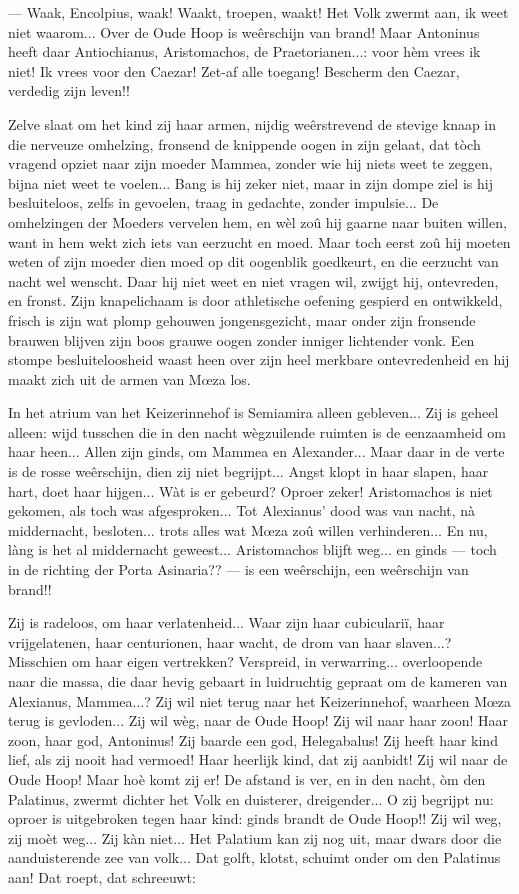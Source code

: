 \documentclass[a4paper, 12pt, oneside, dutch]{article}
\begin{document}
--- Waak, Encolpius, waak! Waakt, troepen, waakt! Het Volk zwermt aan, ik weet niet waarom... Over de Oude Hoop is weêrschijn van brand! Maar Antoninus heeft daar Antiochianus, Aristomachos, de Praetorianen...: voor hèm vrees ik niet! Ik vrees voor den Caezar! Zet-af alle toegang! Bescherm den Caezar, verdedig zijn leven!!

Zelve slaat om het kind zij haar armen, nijdig weêrstrevend de stevige knaap in die nerveuze omhelzing, fronsend de knippende oogen in zijn gelaat, dat tòch vragend opziet naar zijn moeder Mammea, zonder wie hij niets weet te zeggen, bijna niet weet te voelen... Bang is hij zeker niet, maar in zijn dompe ziel is hij besluiteloos, zelfs in gevoelen, traag in gedachte, zonder impulsie... De omhelzingen der Moeders vervelen hem, en wèl zoû hij gaarne naar buiten willen, want in hem wekt zich iets van eerzucht en moed. Maar toch eerst zoû hij moeten weten of zijn moeder dien moed op dit oogenblik goedkeurt, en die eerzucht van nacht wel wenscht. Daar hij niet weet en niet vragen wil, zwijgt hij, ontevreden, en fronst. Zijn knapelichaam is door athletische oefening gespierd en ontwikkeld, frisch is zijn wat plomp gehouwen jongensgezicht, maar onder zijn fronsende brauwen blijven zijn boos grauwe oogen zonder inniger lichtender vonk. Een stompe besluiteloosheid waast heen over zijn heel merkbare ontevredenheid en hij maakt zich uit de armen van Mœza los.

In het atrium van het Keizerinnehof is Semiamira alleen gebleven... Zij is geheel alleen: wijd tusschen die in den nacht wègzuilende ruimten is de eenzaamheid om haar heen... Allen zijn ginds, om Mammea en Alexander... Maar daar in de verte is de rosse weêrschijn, dien zij niet begrijpt... Angst klopt in haar slapen, haar hart, doet haar hijgen... Wàt is er gebeurd? Oproer zeker! Aristomachos is niet gekomen, als toch was afgesproken... Tot Alexianus' dood was van nacht, nà middernacht, besloten... trots alles wat Mœza zoû willen verhinderen... En nu, làng is het al middernacht geweest... Aristomachos blijft weg... en ginds --- toch in de richting der Porta Asinaria?? --- is een weêrschijn, een weêrschijn van brand!!

Zij is radeloos, om haar verlatenheid... Waar zijn haar cubiculariï, haar vrijgelatenen, haar centurionen, haar wacht, de drom van haar slaven...? Misschien om haar eigen vertrekken? Verspreid, in verwarring... overloopende naar die massa, die daar hevig gebaart in luidruchtig gepraat om de kameren van Alexianus, Mammea...? Zij wil niet terug naar het Keizerinnehof, waarheen Mœza terug is gevloden... Zij wil wèg, naar de Oude Hoop! Zij wil naar haar zoon! Haar zoon, haar god, Antoninus! Zij baarde een god, Helegabalus! Zij heeft haar kind lief, als zij nooit had vermoed! Haar heerlijk kind, dat zij aanbidt! Zij wil naar de Oude Hoop! Maar hoè komt zij er! De afstand is ver, en in den nacht, òm den Palatinus, zwermt dichter het Volk en duisterer, dreigender... O zij begrijpt nu: oproer is uitgebroken tegen haar kind: ginds brandt de Oude Hoop!! Zij wil weg, zij moèt weg... Zij kàn niet... Het Palatium kan zij nog uit, maar dwars door die aanduisterende zee van volk... Dat golft, klotst, schuimt onder om den Palatinus aan! Dat roept, dat schreeuwt:
\end{document}
